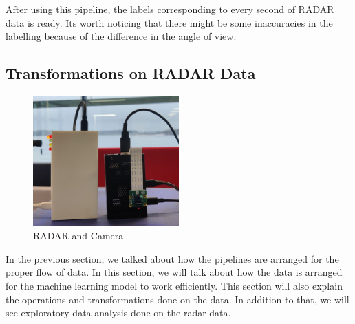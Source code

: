 After using this pipeline, the labels corresponding to every second of RADAR data is ready. Its worth noticing that there might be some inaccuracies in the labelling because of the difference in the angle of view. 

\subsection{Transformations on RADAR Data}
\begin{figure}[ht]
  \begin{center}
    \includegraphics[width=0.5\textwidth]{Master's thesis/images/equipment.jpg} 
    \caption{RADAR and Camera}
    \label{fig:AoA}
  \end{center}
\end{figure}  
In the previous section, we talked about how the pipelines are arranged for the proper flow of data. In this section, we will talk about how the data is arranged for the machine learning model to work efficiently. This section will also explain the operations and transformations done on the data. In addition to that, we will see exploratory data analysis done on the radar data.

